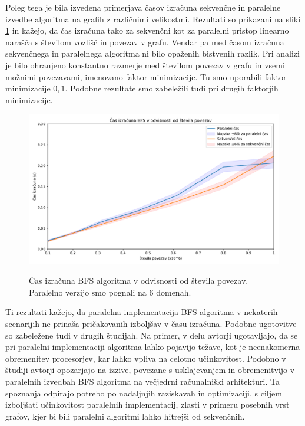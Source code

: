 \documentclass[fin1, tisk]{fmfdelo}
\begin{document}
Poleg tega je bila izvedena primerjava časov izračuna sekvenčne in paralelne izvedbe algoritma na grafih z različnimi velikostmi.
Rezultati so prikazani na sliki \ref{fig:bfs_calculation_time_by_graph_size} in kažejo, da čas izračuna tako za sekvenčni kot za paralelni
pristop linearno narašča s številom vozlišč in povezav v grafu. Vendar pa med časom izračuna sekvenčnega in paralelnega algoritma
ni bilo opaženih bistvenih razlik. Pri analizi je bilo ohranjeno konstantno razmerje med številom povezav v grafu in vsemi
možnimi povezavami, imenovano faktor minimizacije. Tu smo uporabili faktor minimizacije $0,1$. Podobne rezultate smo zabeležili
tudi pri drugih faktorjih minimizacije.

\begin{figure}[h!]
  \centering
  \caption{Čas izračuna BFS algoritma v odvisnosti od števila povezav. Paralelno verzijo smo pognali na 6 domenah.}
  \includegraphics[width=15cm]{slike/bfs_v_odvisnosti_od_velikosti_grafa.pdf}
  \label{fig:bfs_calculation_time_by_graph_size}
\end{figure}

Ti rezultati kažejo, da paralelna implementacija BFS algoritma v nekaterih scenarijih ne prinaša pričakovanih izboljšav v času izračuna.
Podobne ugotovitve so zabeležene tudi v drugih študijah. Na primer, v delu \cite{kuroiwa2020analyzing} avtorji ugotavljajo,
da se pri paralelni implementaciji algoritma lahko pojavijo težave, kot je neenakomerna obremenitev procesorjev, kar
lahko vpliva na celotno učinkovitost. Podobno v študiji \cite{rudolf2019breadth} avtorji opozarjajo na izzive, povezane
s usklajevanjem in obremenitvijo v paralelnih izvedbah BFS algoritma na večjedrni računalniški arhitekturi.
Ta spoznanja odpirajo potrebo po nadaljnjih raziskavah in optimizaciji, s ciljem izboljšati učinkovitost paralelnih implementacij,
zlasti v primeru posebnih vrst grafov, kjer bi bili paralelni algoritmi lahko hitrejši od sekvenčnih.
\end{document}
